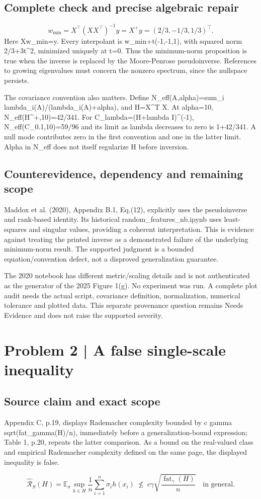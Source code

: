 \documentclass[10pt]{article}
\begin{document}
\subsection*{Complete check and precise algebraic repair}
\[w_{\min}=X^\top(XX^\top)^{-1}y=X^+y=(2/3,-1/3,1/3)^\top.\] Here Xw\_min=y. Every interpolant is w\_min+t(-1,-1,1), with squared norm 2/3+3t\textasciicircum{}2, minimized uniquely at t=0. Thus the minimum-norm proposition is true when the inverse is replaced by the Moore-Penrose pseudoinverse. References to growing eigenvalues must concern the nonzero spectrum, since the nullspace persists.\par
The covariance convention also matters. Define N\_eff(A,alpha)=sum\_i lambda\_i(A)/(lambda\_i(A)+alpha), and H=X\textasciicircum{}T X. At alpha=10, N\_eff(H\textasciicircum{}+,10)=42/341. For C\_lambda=(H+lambda I)\textasciicircum{}(-1), N\_eff(C\_0.1,10)=59/96 and its limit as lambda decreases to zero is 1+42/341. A null mode contributes zero in the first convention and one in the latter limit. Alpha in N\_eff does not itself regularize H before inversion.\par
\subsection*{Counterevidence, dependency and remaining scope}
Maddox et al. (2020), Appendix B.1, Eq.(12), explicitly uses the pseudoinverse and rank-based identity. Its historical random\_features\_nb.ipynb uses least-squares and singular values, providing a coherent interpretation. This is evidence against treating the printed inverse as a demonstrated failure of the underlying minimum-norm result. The supported judgment is a bounded equation/convention defect, not a disproved generalization guarantee.\par
The 2020 notebook has different metric/scaling details and is not authenticated as the generator of the 2025 Figure 1(g). No experiment was run. A complete plot audit needs the actual script, covariance definition, normalization, numerical tolerance and plotted data. This separate provenance question remains Needs Evidence and does not raise the supported severity.\par
\section*{Problem 2 | A false single-scale inequality}
\subsection*{Source claim and exact scope}
Appendix C, p.19, displays Rademacher complexity bounded by c gamma sqrt(fat\_gamma(H)/n), immediately before a generalization-bound expression; Table 1, p.20, repeats the latter comparison. As a bound on the real-valued class and empirical Rademacher complexity defined on the same page, the displayed inequality is false.\par
\[\widehat{\mathcal{R}}_S(H)=\mathbb E_\sigma\sup_{h\in H}\frac1n\sum_{i=1}^n\sigma_i h(x_i)\ \not\le\ c\gamma\sqrt{\frac{\operatorname{fat}_\gamma(H)}{n}}\quad\text{in general}.\]\par
\end{document}
